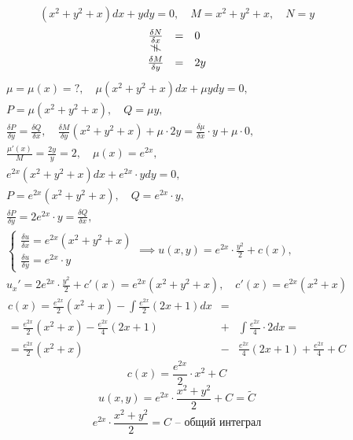 \begin{example}
    \[
        (x^2 + y^2 + x)dx + ydy = 0, \quad M = x^2 + y^2 + x, \quad N = y
    \]
    \[
        \begin{array}{ccl}
            \frac{\delta N}{\delta x} & = & 0  \\
            \vertneq                  &   &    \\
            \frac{\delta M}{\delta y} & = & 2y
        \end{array}
    \]
    \begin{multline*}
        \mu = \mu(x) = ?, \quad \mu(x^2 + y^2 + x)dx + \mu y dy = 0, \\
        P = \mu(x^2 + y^2 + x), \quad Q = \mu y, \\
        \frac{\delta P}{\delta y} = \frac{\delta Q}{\delta x}, \quad \frac{\delta M}{\delta y}(x^2 + y^2 + x) + \mu \cdot 2y = \frac{\delta \mu}{\delta x} \cdot y + \mu \cdot 0, \\
        \frac{\mu'(x)}{M} = \frac{2y}{y} = 2, \quad \mu(x) = e^{2x}, \\
        e^{2x}(x^2 + y^2 + x) dx + e^{2x} \cdot y dy = 0, \\
        P = e^{2x}(x^2 + y^2 + x), \quad Q = e^{2x}\cdot y, \\
        \frac{\delta P}{\delta y} = 2e^{2x} \cdot y = \frac{\delta Q}{\delta x}, \\
        \left\{\begin{array}{l}
            \frac{\delta u}{\delta x} = e^{2x}(x^2 + y^2 + x) \\
            \frac{\delta u}{\delta y} = e^{2x}\cdot y
        \end{array}\right. \implies u(x,y) = e^{2x} \cdot \frac{y^2}{2} + c(x), \\
        u_x' = 2e^{2x} \cdot \frac{y^2}{2} + c'(x) = e^{2x}(x^2 + y^2 + x), \quad c'(x) = e^{2x}(x^2 + x)
    \end{multline*}
    \begin{eqnarray*}
        c(x) = \frac{e^{2x}}{2}(x^2 + x) - \int \frac{e^{2x}}{2}(2x + 1)dx & = & \\
        = \frac{e^{2x}}{2}(x^2 + x) - \frac{e^{2x}}{4}(2x + 1) &+& \int \frac{e^{2x}}{4}\cdot 2 dx = \\
        = \frac{e^{2x}}{2}(x^2 + x) &-& \frac{e^{2x}}{4}(2x+1) + \frac{e^{2x}}{4} + C
    \end{eqnarray*}
    \[
        c(x) = \frac{e^{2x}}{2}\cdot x^2 + C
    \]
    \[
        u(x,y) = e^{2x} \cdot \frac{x^2 + y^2}{2} + C = \widetilde{C}
    \]
    \[
        e^{2x} \cdot \frac{x^2 + y^2}{2} = C\text{ -- общий интеграл}
    \]
\end{example}

